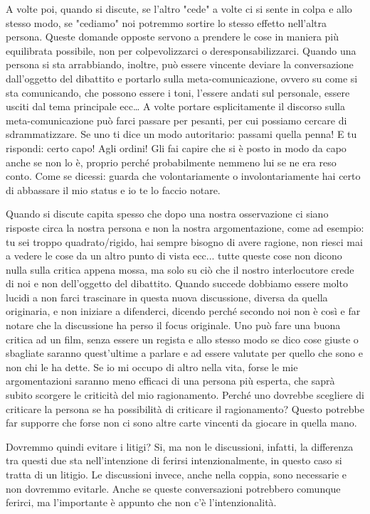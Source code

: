 \documentclass[12pt]{book} %
\begin{document}
A volte poi, quando si discute, se l'altro "cede" a volte ci si sente in colpa e allo stesso modo, se "cediamo" noi potremmo sortire lo stesso effetto nell'altra persona.
Queste domande opposte servono a prendere le cose in maniera più equilibrata possibile, non per colpevolizzarci o deresponsabilizzarci.
Quando una persona si sta arrabbiando, inoltre, può essere vincente deviare la conversazione dall'oggetto del dibattito e portarlo sulla meta-comunicazione, ovvero su come si sta comunicando, che possono essere i toni, l'essere andati sul personale, essere usciti dal tema principale ecc… 
A volte portare esplicitamente il discorso sulla meta-comunicazione può farci passare per pesanti, per cui possiamo cercare di sdrammatizzare. Se uno ti dice un modo autoritario: passami quella penna! E tu rispondi: certo capo! Agli ordini! Gli fai capire che si è posto in modo da capo anche se non lo è, proprio perché probabilmente nemmeno lui se ne era reso conto. Come se dicessi: guarda che volontariamente o involontariamente hai certo di abbassare il mio status e io te lo faccio notare.

Quando si discute capita spesso che dopo una nostra osservazione ci siano risposte circa la nostra persona e non la nostra argomentazione, come ad esempio: tu sei troppo quadrato/rigido, hai sempre bisogno di avere ragione, non riesci mai a vedere le cose da un altro punto di vista ecc... tutte queste cose non dicono nulla sulla critica appena mossa, ma solo su ciò che il nostro interlocutore crede di noi e non dell'oggetto del dibattito. Quando succede dobbiamo essere molto lucidi a non farci trascinare in questa nuova discussione, diversa da quella originaria, e non iniziare a difenderci, dicendo perché secondo noi non è così e far notare che la discussione ha perso il focus originale. Uno può fare una buona critica ad un film, senza essere un regista e allo stesso modo se dico cose giuste o sbagliate saranno quest'ultime a parlare e ad essere valutate per quello che sono e non chi le ha dette. Se io mi occupo di altro nella vita, forse le mie argomentazioni saranno meno efficaci di una persona più esperta, che saprà subito scorgere le criticità del mio ragionamento. Perché uno dovrebbe scegliere di criticare la persona se ha possibilità di criticare il ragionamento? Questo potrebbe far supporre che forse non ci sono altre carte vincenti da giocare in quella mano.

Dovremmo quindi evitare i litigi? Si, ma non le discussioni, infatti, la differenza tra questi due sta
nell'intenzione di ferirsi intenzionalmente, in questo caso si tratta di un litigio. Le
discussioni invece, anche nella coppia, sono necessarie e non dovremmo evitarle. Anche se queste conversazioni
potrebbero comunque ferirci, ma l'importante è appunto che non c'è l'intenzionalità.
\end{document}
